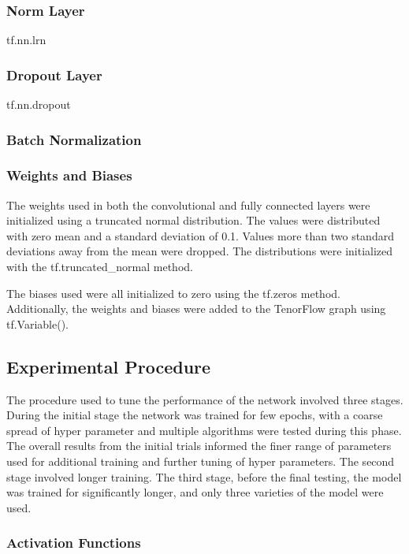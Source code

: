 \documentclass[]{article}
\begin{document}
\subsubsection{Norm Layer}

tf.nn.lrn

\subsubsection{Dropout Layer}

tf.nn.dropout

\subsubsection{Batch Normalization}

\subsubsection{Weights and Biases}

The weights used in both the convolutional and fully connected layers were initialized using a truncated normal distribution. The values were distributed with zero mean and a standard deviation of 0.1. Values more than two standard deviations away from the mean were dropped. The distributions were initialized with the tf.truncated\_normal method. 

The biases used were all initialized to zero using the tf.zeros method. Additionally, the weights and biases were added to the TenorFlow graph using  tf.Variable().

\subsection{Experimental Procedure}

The procedure used to tune the performance of the network involved three stages. During the initial stage the network was trained for few epochs, with a coarse spread of hyper parameter and multiple algorithms were tested during this phase. The overall results from the initial trials informed the finer range of parameters used for additional training and further tuning of hyper parameters. The second stage involved longer training. The third stage, before the final testing, the model was trained for significantly longer, and only three varieties of the model were used. 

\subsubsection{Activation Functions}
\end{document}
